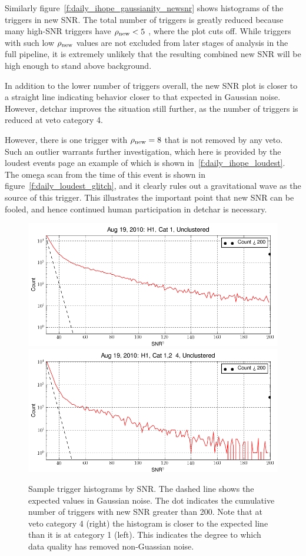 Similarly figure~\ref{f:daily_ihope_gaussianity_newsnr} shows histograms
of the triggers in new SNR.  The total number of triggers is greatly
reduced because many high-SNR triggers have $\rho_{\textrm{new}} < 5$ , where the
plot cuts off.  While triggers with such low $\rho_{\textrm{new}}$ values are not
excluded from later stages of analysis in the full pipeline, it is
extremely unlikely that the resulting combined new SNR will be high
enough to stand above background.

In addition to the lower number of triggers overall, the new SNR plot
is closer to a straight line indicating behavior closer to that
expected in Gaussian noise.  However, detchar improves the situation
still further, as the number of triggers is reduced at veto category
4.

However, there is one trigger with $\rho_{\textrm{new}} = 8$ that is not removed
by any veto.  Such an outlier warrants further investigation, which
here is provided by the loudest events page an example of which is
shown in~\ref{f:daily_ihope_loudest}.  The omega scan from the time of
this event is shown in figure~\ref{f:daily_loudest_glitch}, and it
clearly rules out a gravitational wave as the source of this trigger.
This illustrates the important point that new SNR can be fooled, and
hence continued human participation in detchar is necessary.

\begin{figure}
  \includegraphics[width=0.5\linewidth]{figures/detchar/H1_1_UNCLUSTERED_snr_hist.png}
  \includegraphics[width=0.5\linewidth]{figures/detchar/H1_4_UNCLUSTERED_snr_hist.png}
  \caption[Trigger SNR histograms for H1]{
  \label{f:daily_ihope_gaussianity}
Sample trigger histograms by SNR.  The dashed line shows the
expected values in Gaussian noise.  The dot indicates the cumulative
number of triggers with new SNR greater than 200.  Note that at veto
category 4 (right) the histogram is closer to the expected line than
it is at category 1 (left).  This indicates the degree to which data
quality has removed non-Guassian noise.}
\end{figure}%



